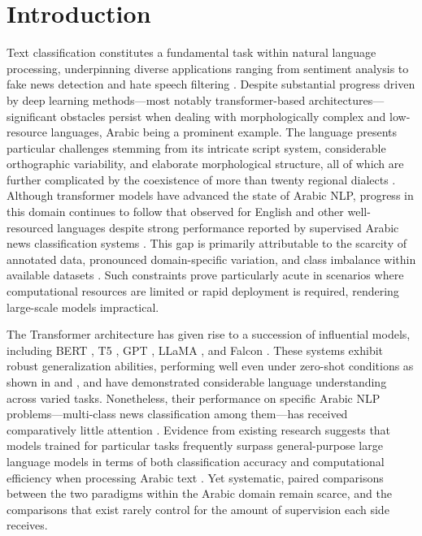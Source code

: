 \documentclass[preprint,12pt,authoryear]{elsarticle}
\newif\ifrevmarkup
\DeclareRobustCommand{\rev}[1]{\ifrevmarkup{\color{blue}#1}\else#1\fi}
\begin{document}
\section{Introduction}
\label{intro}

Text classification constitutes a fundamental task within natural language processing, underpinning diverse applications ranging from sentiment analysis \cite{elnagar2021sentiment,bensoltane2022towards,bentrcia2025hybrid} to fake news detection \cite{nassif2022arabic} and hate speech filtering \cite{elgendy2024toxicity, torfa2025enhancing}. Despite substantial progress driven by deep learning methods---most notably transformer-based architectures---significant obstacles persist when dealing with morphologically complex and low-resource languages, Arabic being a prominent example. The language presents particular challenges stemming from its intricate script system, considerable orthographic variability, and elaborate morphological structure, all of which are further complicated by the coexistence of more than twenty regional dialects \cite{helwe2020semi, talafha2020multi}. Although transformer models have advanced the state of Arabic NLP, progress in this domain continues to follow that observed for English and other well-resourced languages despite strong performance reported by supervised Arabic news classification systems \cite{al2019arabic,elnagar2020arabic}. This gap is primarily attributable to the scarcity of annotated data, pronounced domain-specific variation, and class imbalance within available datasets \cite{alhawarat2020superior, almuzaini2020impact}. Such constraints prove particularly acute in scenarios where computational resources are limited or rapid deployment is required, rendering large-scale models impractical.

The Transformer architecture \cite{vaswani2017attention} has given rise to a succession of influential models, including BERT \cite{devlin2018bert}, T5 \cite{roberts2019exploring}, GPT \cite{DBLP:journals/corr/abs-2005-14165}, LLaMA \cite{touvron2023llama}, and Falcon \cite{almazrouei2023falcon}. These systems exhibit robust generalization abilities, performing well even under zero-shot conditions as shown in \cite{DBLP:journals/corr/abs-1909-00161} and \cite{gera2022zero}, and have demonstrated considerable language understanding across varied tasks. Nonetheless, their performance on specific Arabic NLP problems---multi-class news classification among them---has received comparatively little attention \cite{wahdan2024systematic}. Evidence from existing research suggests that models trained for particular tasks frequently surpass general-purpose large language models in terms of both classification accuracy and computational efficiency when processing Arabic text \cite{alruily2023automated, nassif2022arabic}. \rev{Yet systematic, paired comparisons between the two paradigms within the Arabic domain remain scarce, and the comparisons that exist rarely control for the amount of supervision each side receives.}
\end{document}
